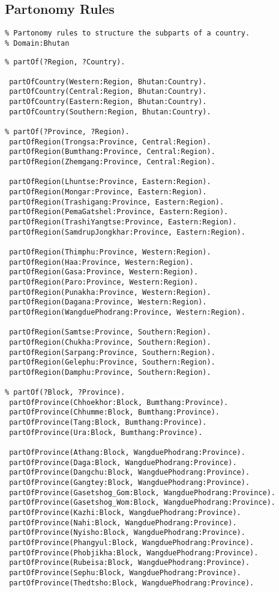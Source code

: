 \subsection*{Partonomy Rules}
\singlespacing
\begin{verbatim}
% Partonomy rules to structure the subparts of a country.
% Domain:Bhutan
\end{verbatim}
\vspace{-0.25in}
\footnotesize
\begin{verbatim}
% partOf(?Region, ?Country).

 partOfCountry(Western:Region, Bhutan:Country).
 partOfCountry(Central:Region, Bhutan:Country).
 partOfCountry(Eastern:Region, Bhutan:Country).
 partOfCountry(Southern:Region, Bhutan:Country).

% partOf(?Province, ?Region).
 partOfRegion(Trongsa:Province, Central:Region).
 partOfRegion(Bumthang:Province, Central:Region).
 partOfRegion(Zhemgang:Province, Central:Region).

 partOfRegion(Lhuntse:Province, Eastern:Region).
 partOfRegion(Mongar:Province, Eastern:Region).
 partOfRegion(Trashigang:Province, Eastern:Region).
 partOfRegion(PemaGatshel:Province, Eastern:Region).
 partOfRegion(TrashiYangtse:Province, Eastern:Region).
 partOfRegion(SamdrupJongkhar:Province, Eastern:Region).

 partOfRegion(Thimphu:Province, Western:Region).
 partOfRegion(Haa:Province, Western:Region).
 partOfRegion(Gasa:Province, Western:Region).
 partOfRegion(Paro:Province, Western:Region).
 partOfRegion(Punakha:Province, Western:Region).
 partOfRegion(Dagana:Province, Western:Region).
 partOfRegion(WangduePhodrang:Province, Western:Region). 

 partOfRegion(Samtse:Province, Southern:Region).
 partOfRegion(Chukha:Province, Southern:Region).
 partOfRegion(Sarpang:Province, Southern:Region).
 partOfRegion(Gelephu:Province, Southern:Region).
 partOfRegion(Damphu:Province, Southern:Region).

% partOf(?Block, ?Province).
 partOfProvince(Chhoekhor:Block, Bumthang:Province).
 partOfProvince(Chhumme:Block, Bumthang:Province).
 partOfProvince(Tang:Block, Bumthang:Province).
 partOfProvince(Ura:Block, Bumthang:Province).

 partOfProvince(Athang:Block, WangduePhodrang:Province).
 partOfProvince(Daga:Block, WangduePhodrang:Province).
 partOfProvince(Dangchu:Block, WangduePhodrang:Province).
 partOfProvince(Gangtey:Block, WangduePhodrang:Province).
 partOfProvince(Gasetshog_Gom:Block, WangduePhodrang:Province).
 partOfProvince(Gasetshog_Wom:Block, WangduePhodrang:Province).
 partOfProvince(Kazhi:Block, WangduePhodrang:Province).
 partOfProvince(Nahi:Block, WangduePhodrang:Province).
 partOfProvince(Nyisho:Block, WangduePhodrang:Province).
 partOfProvince(Phangyul:Block, WangduePhodrang:Province).
 partOfProvince(Phobjikha:Block, WangduePhodrang:Province).
 partOfProvince(Rubeisa:Block, WangduePhodrang:Province). 
 partOfProvince(Sephu:Block, WangduePhodrang:Province).
 partOfProvince(Thedtsho:Block, WangduePhodrang:Province). 


\end{verbatim}
